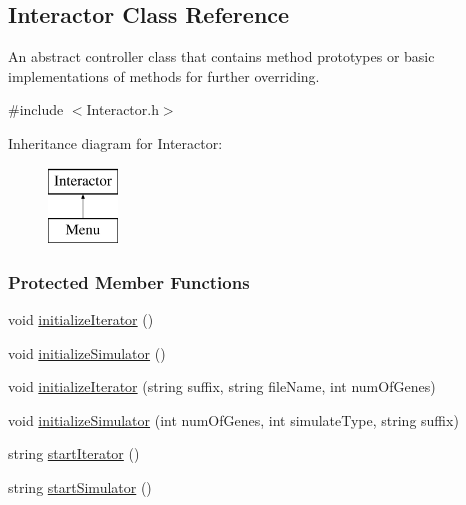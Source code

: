 \hypertarget{class_interactor}{\subsection{Interactor Class Reference}
\label{class_interactor}
}


An abstract controller class that contains method prototypes or basic implementations of methods for further overriding.  




{\ttfamily \#include $<$Interactor.\+h$>$}

Inheritance diagram for Interactor\+:\begin{figure}[H]
\begin{center}
\leavevmode
\includegraphics[height=2.000000cm]{class_interactor}
\end{center}
\end{figure}
\subsubsection*{Protected Member Functions}
\begin{DoxyCompactItemize}
\item 
void \hyperlink{class_interactor_ab67e4ff9ff5d44ee2001e7700dfeb164}{initialize\+Iterator} ()
\item 
void \hyperlink{class_interactor_a8416bb98d11e11b841db245e93c98853}{initialize\+Simulator} ()
\item 
void \hyperlink{class_interactor_aeb10be4d589b66a8624d7221f7600f87}{initialize\+Iterator} (string suffix, string file\+Name, int num\+Of\+Genes)
\item 
void \hyperlink{class_interactor_a1a9260b3dbc1c1f87933f98fadedb979}{initialize\+Simulator} (int num\+Of\+Genes, int simulate\+Type, string suffix)
\item 
string \hyperlink{class_interactor_a20edc6190516131bec1f697b81410550}{start\+Iterator} ()
\item 
string \hyperlink{class_interactor_a60a3be74e1e954f23182fab7b638164e}{start\+Simulator} ()
\end{DoxyCompactItemize}

